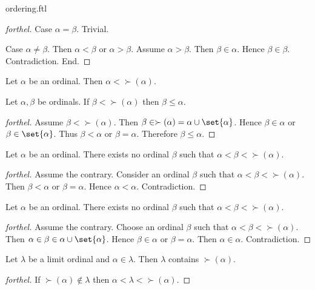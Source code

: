 \documentclass{naproche-library}
\begin{document}
\begin{smodule}{ordering.ftl}
\begin{proof}[forthel]
    Case $\alpha = \beta$. Trivial.

    Case $\alpha \neq \beta$.
      Then $\alpha < \beta$ or $\alpha > \beta$.
      Assume $\alpha > \beta$.
      Then $\beta \in \alpha$.
      Hence $\beta \in \beta$.
      Contradiction.
    End.
  \end{proof}

  \begin{proposition}[forthel,id=SET_THEORY_02_5689190964527104]
    Let $\alpha$ be an ordinal.
    Then $\alpha < \succ(\alpha)$.
  \end{proposition}

  \begin{proposition}[forthel,id=SET_THEORY_02_4064972025888768]
    Let $\alpha, \beta$ be ordinals.
    If $\beta < \succ(\alpha)$ then $\beta \leq \alpha$.
  \end{proposition}
  \begin{proof}[forthel]
    Assume $\beta < \succ(\alpha)$.
    Then $\beta \in \succ(\alpha) = \alpha \cup \set{\alpha}$.
    Hence $\beta \in \alpha$ or $\beta \in \set{\alpha}$.
    Thus $\beta < \alpha$ or $\beta = \alpha$.
    Therefore $\beta \leq \alpha$.
  \end{proof}

  \begin{proposition}[forthel,id=SET_THEORY_02_8242798790705152]
    Let $\alpha$ be an ordinal.
    There exists no ordinal $\beta$ such that $\alpha < \beta < \succ(\alpha)$.
  \end{proposition}
  \begin{proof}[forthel]
    Assume the contrary.
    Consider an ordinal $\beta$ such that $\alpha < \beta < \succ(\alpha)$.
    Then $\beta < \alpha$ or $\beta = \alpha$.
    Hence $\alpha < \alpha$.
    Contradiction.
  \end{proof}

  \begin{proposition}[forthel,id=SET_THEORY_02_4240355610329088]
    Let $\alpha$ be an ordinal.
    There exists no ordinal $\beta$ such that $\alpha < \beta < \succ(\alpha)$.
  \end{proposition}
  \begin{proof}[forthel]
    Assume the contrary.
    Choose an ordinal $\beta$ such that $\alpha < \beta < \succ(\alpha)$.
    Then $\alpha \in \beta \in \alpha \cup \set{\alpha}$.
    Hence $\beta \in \alpha$ or $\beta = \alpha$.
    Then $\alpha \in \alpha$.
    Contradiction.
  \end{proof}

  \begin{proposition}[forthel,id=SET_THEORY_02_4659024620421120]
    Let $\lambda$ be a limit ordinal and $\alpha \in \lambda$.
    Then $\lambda$ contains $\succ(\alpha)$.
  \end{proposition}
  \begin{proof}[forthel]
    If $\succ(\alpha) \notin \lambda$ then $\alpha < \lambda < \succ(\alpha)$.
  \end{proof}
\end{smodule}
\end{document}
